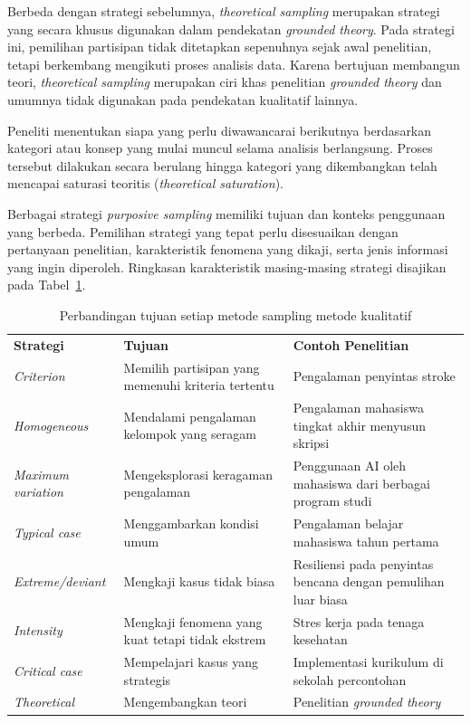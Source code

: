 \documentclass[
  indonesian,
  letterpaper,
  DIV=11,
  numbers=noendperiod]{scrreprt}
\begin{document}
\begin{enumerate}
  Berbeda dengan strategi sebelumnya, \emph{theoretical sampling}
  merupakan strategi yang secara khusus digunakan dalam pendekatan
  \emph{grounded theory}. Pada strategi ini, pemilihan partisipan tidak
  ditetapkan sepenuhnya sejak awal penelitian, tetapi berkembang
  mengikuti proses analisis data. Karena bertujuan membangun teori,
  \emph{theoretical sampling} merupakan ciri khas penelitian
  \emph{grounded theory} dan umumnya tidak digunakan pada pendekatan
  kualitatif lainnya.

  Peneliti menentukan siapa yang perlu diwawancarai berikutnya
  berdasarkan kategori atau konsep yang mulai muncul selama analisis
  berlangsung. Proses tersebut dilakukan secara berulang hingga kategori
  yang dikembangkan telah mencapai saturasi teoritis (\emph{theoretical
  saturation}).
\end{enumerate}

Berbagai strategi \emph{purposive sampling} memiliki tujuan dan konteks
penggunaan yang berbeda. Pemilihan strategi yang tepat perlu disesuaikan
dengan pertanyaan penelitian, karakteristik fenomena yang dikaji, serta
jenis informasi yang ingin diperoleh. Ringkasan karakteristik
masing-masing strategi disajikan pada Tabel~\ref{tbl-samplingkuali}.

\begin{longtable}[]{@{}
  >{\raggedright\arraybackslash}p{}
  >{\raggedright\arraybackslash}p{}
  >{\raggedright\arraybackslash}p{}@{}}
\caption{Perbandingan tujuan setiap metode sampling metode
kualitatif}\label{tbl-samplingkuali}\tabularnewline
\toprule\noalign{}
\endfirsthead
\endhead
\bottomrule\noalign{}
\endlastfoot
\textbf{Strategi} & \textbf{Tujuan} & \textbf{Contoh Penelitian} \\
\emph{Criterion} & Memilih partisipan yang memenuhi kriteria tertentu &
Pengalaman penyintas stroke \\
\emph{Homogeneous} & Mendalami pengalaman kelompok yang seragam &
Pengalaman mahasiswa tingkat akhir menyusun skripsi \\
\emph{Maximum variation} & Mengeksplorasi keragaman pengalaman &
Penggunaan AI oleh mahasiswa dari berbagai program studi \\
\emph{Typical case} & Menggambarkan kondisi umum & Pengalaman belajar
mahasiswa tahun pertama \\
\emph{Extreme/deviant} & Mengkaji kasus tidak biasa & Resiliensi pada
penyintas bencana dengan pemulihan luar biasa \\
\emph{Intensity} & Mengkaji fenomena yang kuat tetapi tidak ekstrem &
Stres kerja pada tenaga kesehatan \\
\emph{Critical case} & Mempelajari kasus yang strategis & Implementasi
kurikulum di sekolah percontohan \\
\emph{Theoretical} & Mengembangkan teori & Penelitian \emph{grounded
theory} \\
\end{longtable}
\end{document}
